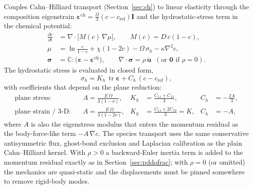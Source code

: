 \documentclass[11pt,a4paper]{article}
\newcommand{\Lap}{\nabla^{2}}
\newcommand{\Grad}{\nabla}
\newcommand{\Div}{\nabla\cdot}
\begin{document}
Couples Cahn--Hilliard transport (Section~\ref{sec:ch}) to linear
elasticity through the composition eigenstrain
$\boldsymbol\varepsilon^{\mathrm{ch}}=\frac{\Omega}{3}(c-c_{\mathrm{ref}})\mathbf I$
and the hydrostatic-stress term in the chemical potential:
\begin{align}
  \frac{\partial c}{\partial t}
    &= \Div\!\bigl[M(c)\,\Grad\mu\bigr],
    \qquad M(c)=D\,c(1-c),\\
  \mu &= \ln\frac{c}{1-c}+\chi(1-2c)
        -\Omega\,\sigma_h - \kappa\Lap c,\\
  \boldsymbol\sigma &= \mathbb C :
    \bigl(\boldsymbol\varepsilon-\boldsymbol\varepsilon^{\mathrm{ch}}\bigr),
  \qquad
  \Div\boldsymbol\sigma = \rho\,\ddot{\mathbf u}
  \;\;(\text{or } \mathbf 0 \text{ if } \rho = 0).
\end{align}
The hydrostatic stress is evaluated in closed form,
\begin{equation}
  \sigma_h = K_h\,\operatorname{tr}\boldsymbol\varepsilon
           + C_h\,(c-c_{\mathrm{ref}}),
\end{equation}
with coefficients that depend on the plane reduction:
\begin{equation}
  \begin{aligned}
  \text{plane stress:}\quad
    & A=\frac{E\,\Omega}{3(1-\nu)}, &
    K_h&=\frac{C_{11}+C_{12}}{3}, &
    C_h&=-\frac{2A}{3},\\
  \text{plane strain / 3-D:}\quad
    & A=\frac{E\,\Omega}{3(1-2\nu)}, &
    K_h&=\frac{C_{11}+2C_{12}}{3}=K, &
    C_h&=-A,
  \end{aligned}
  \label{eq:sigmah}
\end{equation}
where $A$ is also the eigenstress modulus that enters the momentum
residual as the body-force-like term $-A\,\Grad c$. The species
transport uses the same conservative antisymmetric flux, ghost-bond
exclusion and Laplacian calibration as the plain Cahn--Hilliard
kernel. With $\rho>0$ a backward-Euler inertia term is added to the
momentum residual exactly as in Section~\ref{sec:pddofrac}; with
$\rho=0$ (or omitted) the mechanics are quasi-static and the
displacements must be pinned somewhere to remove rigid-body modes.
\end{document}
